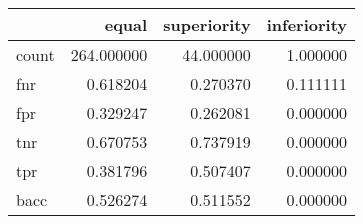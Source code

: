 \begin{tabular}{lrrr}
\toprule
{} &       equal &  superiority &  inferiority \\
\midrule
count &  264.000000 &    44.000000 &     1.000000 \\
fnr   &    0.618204 &     0.270370 &     0.111111 \\
fpr   &    0.329247 &     0.262081 &     0.000000 \\
tnr   &    0.670753 &     0.737919 &     0.000000 \\
tpr   &    0.381796 &     0.507407 &     0.000000 \\
bacc  &    0.526274 &     0.511552 &     0.000000 \\
\bottomrule
\end{tabular}
